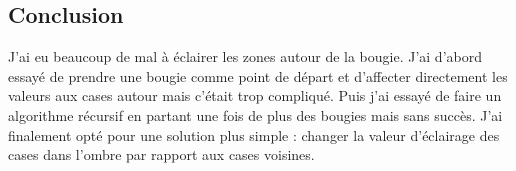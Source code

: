 \documentclass{article}
\begin{document}
\subsection*{Conclusion}
J'ai eu beaucoup de mal à éclairer les zones autour de la bougie. J'ai d'abord essayé de prendre une bougie comme point de départ et d'affecter directement les valeurs aux cases autour mais c'était trop compliqué. Puis j'ai essayé de faire un algorithme récursif en partant une fois de plus des bougies mais sans succès. J'ai finalement opté pour une solution plus simple : changer la valeur d'éclairage des cases dans l'ombre par rapport aux cases voisines.
\end{document}
